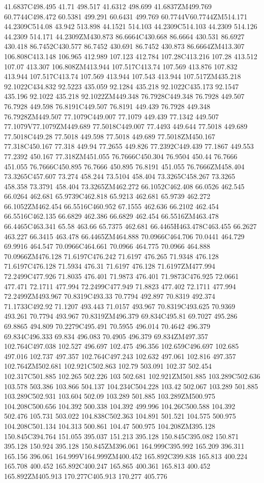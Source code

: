 41.6837C498.495 41.71 498.517 41.6312 498.699 41.6837ZM499.769 60.7744C498.472 60.5381 499.291 60.6431 499.769 60.7744V60.7744ZM514.171 44.2309C514.08 43.942 513.898 44.1521 514.103 44.2309C514.103 44.2309 514.126 44.2309 514.171 44.2309ZM430.873 86.6664C430.668 86.6664 430.531 86.6927 430.418 86.7452C430.577 86.7452 430.691 86.7452 430.873 86.6664ZM413.307 106.808C413.148 106.965 412.989 107.123 412.784 107.28C413.216 107.28 413.512 107.07 413.307 106.808ZM413.944 107.517C413.74 107.569 413.876 107.832 413.944 107.517C413.74 107.569 413.944 107.543 413.944 107.517ZM435.218 92.1022C434.832 92.5223 435.059 92.1284 435.218 92.1022C435.173 92.1547 435.196 92.1022 435.218 92.1022ZM449.348 76.7928C449.348 76.7928 449.507 76.7928 449.598 76.8191C449.507 76.8191 449.439 76.7928 449.348 76.7928ZM449.507 77.1079C449.007 77.1079 449.439 77.1342 449.507 77.1079V77.1079ZM449.689 77.5018C449.007 77.4493 449.644 77.5018 449.689 77.5018C449.28 77.5018 449.598 77.5018 449.689 77.5018ZM450.167 77.318C450.167 77.318 449.94 77.2655 449.826 77.2392C449.439 77.1867 449.553 77.2392 450.167 77.318ZM451.055 76.7666C450.304 76.9504 450.44 76.7666 451.055 76.7666C450.895 76.7666 450.895 76.8191 451.055 76.7666ZM458.404 73.3265C457.607 73.274 458.244 73.5104 458.404 73.3265C458.267 73.3265 458.358 73.3791 458.404 73.3265ZM462.272 66.1052C462.408 66.0526 462.545 66.0264 462.681 65.9739C462.818 65.9213 462.681 65.9739 462.272 66.1052ZM462.454 66.5516C460.952 67.1555 462.636 66.2102 462.454 66.5516C462.135 66.6829 462.386 66.6829 462.454 66.5516ZM463.478 66.4465C463.341 65.58 463.66 65.7375 462.681 66.4465H463.478C463.455 66.2627 463.227 66.3415 463.478 66.4465ZM464.888 70.0966C464.706 70.0441 464.729 69.9916 464.547 70.0966C464.661 70.0966 464.775 70.0966 464.888 70.0966ZM476.128 71.6197C476.242 71.6197 476.265 71.9348 476.128 71.6197C476.128 71.5934 476.31 71.6197 476.128 71.6197ZM477.994 72.2499C477.926 71.8035 476.401 71.9873 476.401 71.9873C476.925 72.0661 477.471 72.1711 477.994 72.2499C477.949 71.8823 477.402 72.1711 477.994 72.2499ZM493.967 70.8319C493.33 70.7794 492.897 70.8319 492.374 71.1733C492.92 71.1207 493.443 71.0157 493.967 70.8319C493.625 70.9369 493.261 70.7794 493.967 70.8319ZM496.379 69.834C495.81 69.7027 495.286 69.8865 494.809 70.2279C495.491 70.5955 496.014 70.4642 496.379 69.834C496.333 69.834 496.083 70.4905 496.379 69.834ZM497.357 102.764C497.038 102.527 496.697 102.475 496.356 102.659C496.697 102.685 497.016 102.737 497.357 102.764C497.243 102.632 497.061 102.816 497.357 102.764ZM502.681 102.921C502.863 102.79 503.091 102.37 502.454 102.317C501.885 102.265 502.226 103 502.681 102.921ZM501.885 103.289C502.636 103.578 503.386 103.866 504.137 104.234C504.228 103.42 502.067 103.289 501.885 103.289C502.931 103.604 502.09 103.289 501.885 103.289ZM500.975 104.208C500.656 104.392 500.338 104.392 499.996 104.26C500.588 104.392 502.476 105.731 503.022 104.838C502.363 104.891 501.521 104.575 500.975 104.208C501.134 104.313 500.861 104.47 500.975 104.208ZM395.128 150.845C394.764 151.055 395.037 151.213 395.128 150.845C395.082 150.871 395.128 150.924 395.128 150.845ZM396.061 164.999C395.992 165.209 396.311 165.156 396.061 164.999V164.999ZM400.452 165.892C399.838 165.813 400.224 165.708 400.452 165.892C400.247 165.865 400.361 165.813 400.452 165.892ZM405.913 170.277C405.913 170.277 405.776 